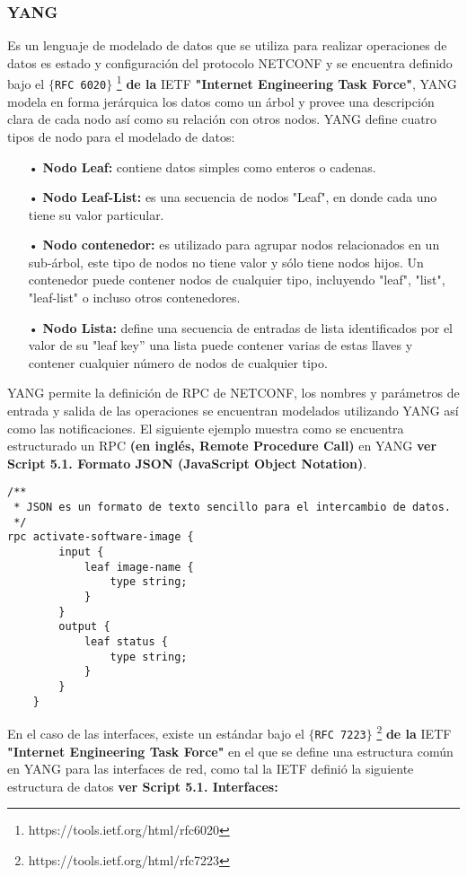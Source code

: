\subsubsection{YANG}
\label{sec:YANG}


Es un lenguaje de modelado de datos que se utiliza para realizar operaciones de datos es estado y configuración del protocolo NETCONF y se encuentra definido bajo el \texttt{$\{$RFC 6020$\}$} 
\footnote{https://tools.ietf.org/html/rfc6020} \textbf{de la} IETF \textbf{"Internet Engineering Task Force"}, YANG modela en forma jerárquica los datos como un árbol y provee una descripción clara de cada nodo así como su relación con otros nodos. YANG define cuatro tipos de nodo para el modelado de datos:

\begin{itemize}
\item[•] \textbf{Nodo Leaf:} contiene datos simples como enteros o cadenas.
\item[•] \textbf{Nodo Leaf-List:}  es una secuencia de nodos "Leaf", en donde cada uno tiene su valor particular.
\item[•]\textbf{Nodo contenedor:} es utilizado para agrupar nodos relacionados en un sub-árbol, este tipo de nodos no tiene valor y sólo tiene nodos hijos. Un contenedor puede contener nodos de cualquier tipo, incluyendo "leaf", "list", "leaf-list" o incluso otros contenedores.
\item[•] \textbf{Nodo Lista:} define una secuencia de entradas de lista identificados por el valor de su "leaf key” una lista puede contener varias de estas llaves y contener cualquier número de nodos de cualquier tipo.
\end{itemize}
YANG permite la definición de RPC de NETCONF, los nombres y parámetros de entrada y salida de las operaciones se encuentran modelados utilizando YANG así como las notificaciones. El siguiente ejemplo muestra como se encuentra estructurado un RPC \textbf{(en inglés, Remote Procedure Call)} en YANG \textbf{ver Script 5.1. Formato JSON \textbf{(JavaScript Object Notation)}}.

\lstset{language=java, caption=RPC Estructura en YANG, label=lst:YANG}
\begin{lstlisting}
/** 
 * JSON es un formato de texto sencillo para el intercambio de datos.  
 */
rpc activate-software-image {
        input {
            leaf image-name {
                type string;
            }
        }
        output {
            leaf status {
                type string;
            }
        }
    }
\end{lstlisting}
En el caso de las interfaces, existe un estándar bajo el \texttt{$\{$RFC 7223$\}$} 
\footnote{https://tools.ietf.org/html/rfc7223} \textbf{de la} IETF \textbf{"Internet Engineering Task Force"} en el que se define una estructura común en YANG para las interfaces de red, como tal la IETF definió la siguiente estructura de datos \textbf{ver Script 5.1. Interfaces:}

